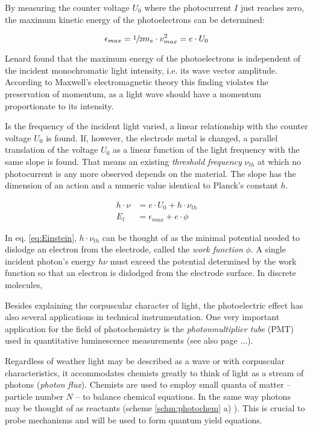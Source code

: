 	By measuring the counter voltage $U_0$ where the photocurrent $I$ just reaches zero, the maximum kinetic energy of the photoelectrons can be determined:

	\begin{equation}[h]%
		\epsilon_{max} = \sfrac{1}{2}m_e\cdot v^2_{max} = e\cdot U_0
	\end{equation}

	Lenard found that the maximum energy of the photoelectrons is independent of the incident monochromatic light intensity, i.e. its wave vector amplitude. According to Maxwell's electromagnetic theory this finding violates the preservation of momentum, as a light wave should have a momentum proportionate to its intensity. 

	Is the frequency of the incident light varied, a linear relationship with the counter voltage $U_0$ is found. If, however, the electrode metal is changed, a parallel translation of the voltage $U_0$ as a linear function of the light frequency with the same slope is found. That means an existing \emph{threshold frequency} $\nu_{th}$ at which no photocurrent is any more observed depends on the material. The slope has the dimension of an action and a numeric value identical to Planck's constant $h$. 

	\begin{equation}[h]%
		\label{eq:Einstein}
		\begin{split}%
			h\cdot\nu &= e\cdot U_0 + h\cdot\nu_{th} \\
			E_l &= \epsilon_{max} + e\cdot\phi
		\end{split}
	\end{equation}

	In eq. \ref{eq:Einstein}, $h\cdot\nu_{th}$ can be thought of as the minimal potential needed to dislodge an electron from the electrode, called the \emph{work function} $\phi$. A single incident photon's energy $h\nu$ must exceed the potential determined by the work function so that an electron is dislodged from the electrode surface. In discrete molecules,

	Besides explaining the corpuscular character of light, the photoelectric effect has also several applications in technical instrumentation. One very important application for the field of photochemistry is the \emph{photonmultiplier tube} (PMT) used in quantitative luminescence measurements (see also page ...).

	Regardless of weather light may be described as a wave or with corpuscular characteristics, it accommodates chemists greatly to think of light as a stream of photons (\emph{photon flux}). Chemists are used to employ small quanta of matter -- particle number $N$ -- to balance chemical equations. In the same way photons may be thought of as reactants (scheme \ref{schm:photochem} a) ). This is crucial to probe mechanisms and will be used to form quantum yield equations. 

